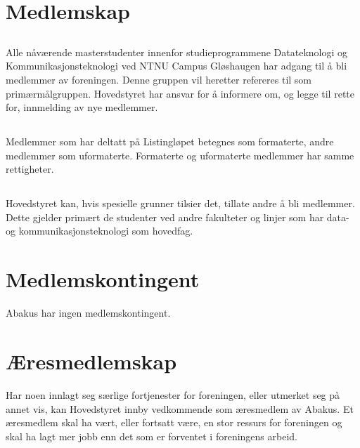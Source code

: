 \section{Medlemskap}

\subsection{}
Alle nåværende masterstudenter innenfor studieprogrammene Datateknologi og Kommunikasjonsteknologi
ved NTNU Campus Gløshaugen har adgang til å bli medlemmer av foreningen. Denne gruppen vil heretter refereres til som primærmålgruppen. Hovedstyret har ansvar
for å informere om, og legge til rette for, innmelding av nye medlemmer.

\subsection{}
Medlemmer som har deltatt på Listingløpet betegnes som formaterte, andre
medlemmer som uformaterte. Formaterte og uformaterte medlemmer har samme
rettigheter.

\subsection{}
Hovedstyret kan, hvis spesielle grunner tilsier det, tillate andre å bli
medlemmer. Dette gjelder primært de studenter ved andre fakulteter og linjer
som har data- og kommunikasjonsteknologi som hovedfag.

\section{Medlemskontingent}
Abakus har ingen medlemskontingent.

\section{Æresmedlemskap}
Har noen innlagt seg særlige fortjenester for foreningen, eller utmerket seg
på annet vis, kan Hovedstyret innby vedkommende som æresmedlem av Abakus. Et
æresmedlem skal ha vært, eller fortsatt være, en stor ressurs for foreningen og
skal ha lagt mer jobb enn det som er forventet i foreningens arbeid.
